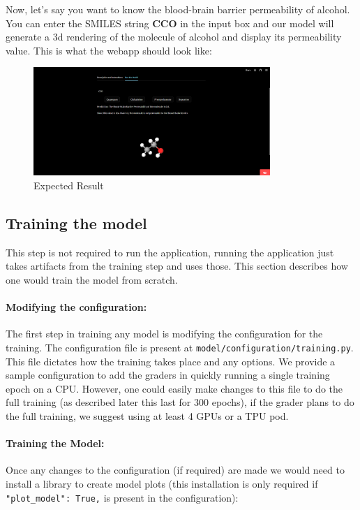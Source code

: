 \documentclass[fontsize=11pt]{article}
\begin{document}
Now, let's say you want to know the blood-brain barrier permeability of alcohol. You can enter the SMILES string \textbf{CCO} in the input box and our model will generate a 3d rendering of the molecule of alcohol and display its permeability value. This is what the webapp should look like:

\begin{figure}[ht]
    \centering
    \includegraphics[width=0.8\textwidth]{webapp3.png}
    \caption{Expected Result}
    \label{fig:visualizeaugmentations}
\end{figure}

\subsection*{Training the model}

This step is not required to run the application, running the application just takes artifacts from the training step and uses those. This section describes how one would train the model from scratch.

\paragraph{Modifying the configuration:} The first step in training any model is modifying the configuration for the training. The configuration file is present at \texttt{model/configuration/training.py}. This file dictates how the training takes place and any options. We provide a sample configuration to add the graders in quickly running a single training epoch on a CPU. However, one could easily make changes to this file to do the full training (as described later this last for $300$ epochs), if the grader plans to do the full training, we suggest using at least 4 GPUs or a TPU pod.

\paragraph{Training the Model:} Once any changes to the configuration (if required) are made we would need to install a library to create model plots (this installation is only required if \texttt{"plot\_model": True,} is present in the configuration):
\end{document}
